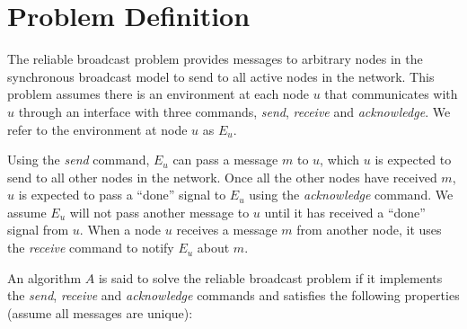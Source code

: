 \documentclass[english]{article}
\begin{document}
\section{Problem Definition}

The reliable broadcast problem provides messages to arbitrary nodes in the synchronous broadcast model to send to all active nodes in the network. This problem assumes there is an environment at each node $u$ that communicates with $u$ through an  interface with three commands, \textit{send}, \textit{receive} and \textit{acknowledge}. We refer to the environment at node $u$ as $E_u$.

Using the \textit{send} command, $E_u$ can pass a message $m$ to $u$, which $u$ is expected to send to all other nodes in the network. Once all the other nodes have received $m$, $u$ is expected to pass a ``done'' signal to $E_u$ using the \textit{acknowledge} command. We assume $E_u$ will not pass another message to $u$ until it has received a ``done'' signal from $u$. 
When a node $u$ receives a message $m$ from another node, it uses the \textit{receive} command to notify $E_u$ about $m$.

An algorithm $A$ is said to solve the reliable broadcast problem if it implements the \textit{send}, \textit{receive} and \textit{acknowledge} commands and satisfies the following properties (assume all messages are unique):
\end{document}
